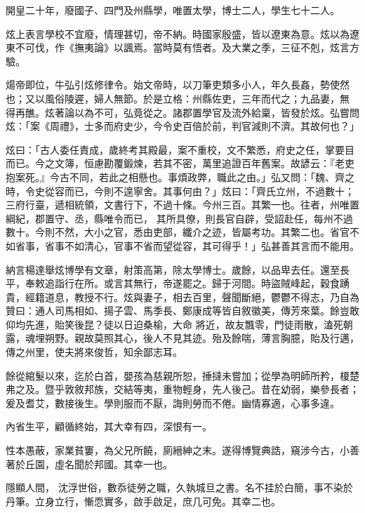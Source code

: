 \begin{pinyinscope}
 開皇二十年，廢國子、四門及州縣學，唯置太學，博士二人，學生七十二人。



 炫上表言學校不宜廢，情理甚切，帝不納。時國家殷盛，皆以遼東為意。炫以為遼東不可伐，作《撫夷論》以諷焉。當時莫有悟者。及大業之季，三征不剋，炫言方驗。



 煬帝即位，牛弘引炫修律令。始文帝時，以刀筆吏類多小人，年久長姦，勢使然也；又以風俗陵遲，婦人無節。於是立格：州縣佐吏，三年而代之；九品妻，無
 得再醮。炫著論以為不可，弘竟從之。諸郡置學官及流外給稟，皆發於炫。弘嘗問炫：「案《周禮》，士多而府史少，今令史百倍於前，判官減則不濟。其故何也？」



 炫曰：「古人委任責成，歲終考其殿最，案不重校，文不繁悉，府史之任，掌要目而已。今之文簿，恒慮勘覆鍛煉，若其不密，萬里追證百年舊案。故諺云：『老吏抱案死。』今古不同，若此之相懸也。事煩政弊，職此之由。」弘又問：「魏、齊之時，令史從容而已，今則不遑寧舍。其事何由？」炫曰：「齊氏立州，不過數十；三府行臺，遞相統領，文書行下，不過十條。今州三百。其繁一也。往者，州唯置綱紀，郡置守、丞，縣唯令而已，
 其所具僚，則長官自辟，受詔赴任，每州不過數十。今則不然，大小之官，悉由吏部，纖介之迹，皆屬考功。其繁二也。省官不如省事，省事不如清心，官事不省而望從容，其可得乎！」弘甚善其言而不能用。



 納言楊達舉炫博學有文章，射策高第，除太學博士。歲餘，以品卑去任。還至長平，奉敕追詣行在所。或言其無行，帝遂罷之。歸于河間。時盜賊峰起，穀食踴貴，經籍道息，教授不行。炫與妻子，相去百里，聲聞斷絕，鬱鬱不得志，乃自為贊曰：通人司馬相如、揚子雲、馬季長、鄭康成等皆自敘徽美，傳芳來葉。餘豈敢仰均先進，貽笑後昆？徒以日迫桑榆，大命
 將近，故友飄零，門徒雨散，溘死朝露，魂埋朔野。親故莫照其心，後人不見其迹。殆及餘喘，薄言胸臆，貽及行邁，傳之州里，使夫將來俊哲，知余鄙志耳。



 餘從綰髮以來，迄於白首，嬰孩為慈親所恕，捶撻未嘗加；從學為明師所矜，榎楚弗之及。暨乎敦敘邦族，交結等夷，重物輕身，先人後己。昔在幼弱，樂參長者；爰及耆艾，數接後生。學則服而不厭，誨則勞而不倦。幽情寡適，心事多違。



 內省生平，顧循終始，其大幸有四，深恨有一。



 性本愚蔽，家業貧窶，為父兄所饒，廁縉紳之末。遂得博覽典誥，窺涉今古，小善著於丘園，虛名聞於邦國。其幸一也。



 隱顯人間，
 沈浮世俗，數忝徒勞之職，久執城旦之書。名不挂於白簡，事不染於丹筆。立身立行，慚恧實多，啟手啟足，庶几可免。其幸二也。




\end{pinyinscope}
